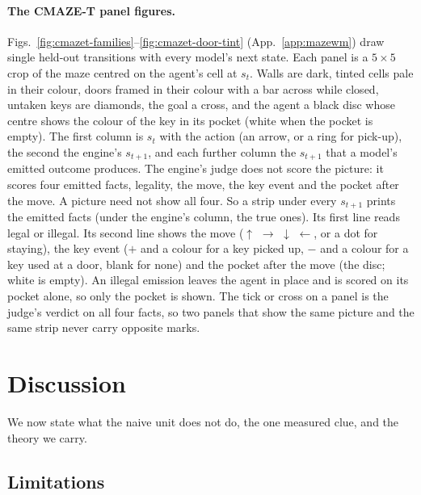 \documentclass{article} %
\begin{document}
\paragraph{The CMAZE-T panel figures.} Figs.~\ref{fig:cmazet-families}--\ref{fig:cmazet-door-tint}
(App.~\ref{app:mazewm}) draw single held-out transitions with every model's next state. Each panel
is a $5\times5$ crop of the maze centred on the agent's cell at $s_t$. Walls are dark, tinted cells
pale in their colour, doors framed in their colour with a bar across while closed, untaken keys are
diamonds, the goal a cross, and the agent a black disc whose centre shows the colour of the key in its
pocket (white when the pocket is empty). The first column is $s_t$ with the action (an arrow, or a
ring for pick-up), the second the engine's $s_{t+1}$, and each further column the $s_{t+1}$ that a
model's emitted outcome produces. The engine's judge does not score the picture: it scores four
emitted facts, legality, the move, the key event and the pocket after the move. A picture need
not show all four. So a strip under every $s_{t+1}$ prints the emitted facts (under the engine's
column, the true ones). Its first line reads legal or illegal. Its second line shows the move
($\uparrow$ $\rightarrow$ $\downarrow$ $\leftarrow$, or a dot for staying), the key event ($+$ and a
colour for a key picked up, $-$ and a colour for a key used at a door, blank for none) and the pocket
after the move (the disc; white is empty). An illegal emission leaves the agent in place and is scored
on its pocket alone, so only the pocket is shown. The tick or cross on a panel is the judge's verdict
on all four facts, so two panels that show the same picture and the same strip never carry opposite
marks.

\section{Discussion}
\label{sec:limits}

We now state what the naive unit does not do, the one measured clue, and the theory we carry.

\subsection{Limitations}
\label{sec:limits-list}
\end{document}
